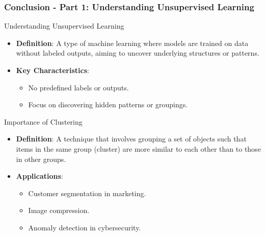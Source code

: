 \documentclass[aspectratio=169]{beamer}
\begin{document}
\begin{frame}[fragile]
    \frametitle{Conclusion - Part 1: Understanding Unsupervised Learning}
    
    \begin{block}{Understanding Unsupervised Learning}
        \begin{itemize}
            \item \textbf{Definition}: A type of machine learning where models are trained on data without labeled outputs, aiming to uncover underlying structures or patterns.
            \item \textbf{Key Characteristics}:
                \begin{itemize}
                    \item No predefined labels or outputs.
                    \item Focus on discovering hidden patterns or groupings.
                \end{itemize}
        \end{itemize}
    \end{block}
    
    \begin{block}{Importance of Clustering}
        \begin{itemize}
            \item \textbf{Definition}: A technique that involves grouping a set of objects such that items in the same group (cluster) are more similar to each other than to those in other groups.
            \item \textbf{Applications}:
                \begin{itemize}
                    \item Customer segmentation in marketing.
                    \item Image compression.
                    \item Anomaly detection in cybersecurity.
                \end{itemize}
        \end{itemize}
    \end{block}
\end{frame}
\end{document}
